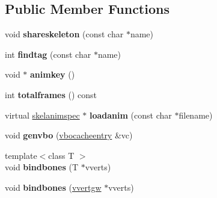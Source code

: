 \subsection*{Public Member Functions}
\begin{DoxyCompactItemize}
\item 
\mbox{\label{structskelmodel_1_1skelmeshgroup_a23bf7ca4d440517e4ad1214cf2955884}} 
void {\bfseries shareskeleton} (const char $\ast$name)
\item 
\mbox{\label{structskelmodel_1_1skelmeshgroup_a76d2cc27e8de20d767cd4fda03e60a69}} 
int {\bfseries findtag} (const char $\ast$name)
\item 
\mbox{\label{structskelmodel_1_1skelmeshgroup_a1ef964c40eb13c4593a5fc42fca07260}} 
void $\ast$ {\bfseries animkey} ()
\item 
\mbox{\label{structskelmodel_1_1skelmeshgroup_a220fec6d06c7a4bfb5637face30165d2}} 
int {\bfseries totalframes} () const
\item 
\mbox{\label{structskelmodel_1_1skelmeshgroup_a74c9c4c712fda88792234859c8c775a0}} 
virtual \hyperlink{structskelmodel_1_1skelanimspec}{skelanimspec} $\ast$ {\bfseries loadanim} (const char $\ast$filename)
\item 
\mbox{\label{structskelmodel_1_1skelmeshgroup_a1e401a7f53f2d13e8d9b0b3593af1485}} 
void {\bfseries genvbo} (\hyperlink{structskelmodel_1_1vbocacheentry}{vbocacheentry} \&vc)
\item 
\mbox{\label{structskelmodel_1_1skelmeshgroup_a10676a3495de19ca896a137e0529ee06}} 
{\footnotesize template$<$class T $>$ }\\void {\bfseries bindbones} (T $\ast$vverts)
\item 
\mbox{\label{structskelmodel_1_1skelmeshgroup_a34844c9677679ad4078ab8063830e672}} 
void {\bfseries bindbones} (\hyperlink{structskelmodel_1_1vvertgw}{vvertgw} $\ast$vverts)
\item 
\mbox{\label{structskelmodel_1_1skelmeshgroup_acb50fec9f282b22f64a4d57a65b66365}} 

\end{DoxyCompactItemize}
